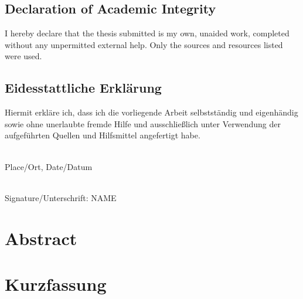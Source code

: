 \documentclass[a4paper,twoside,10pt,]{book}
\begin{document}
\frontmatter

\tpage

\cleardoublepage

\cleardoublepage
\addtocounter{page}{-2}
\section*{Declaration of Academic Integrity}

I hereby declare that the thesis submitted is my own, unaided work, completed without any unpermitted external help. Only the sources and resources listed were used.

\section*{Eidesstattliche Erklärung}

\noindent Hiermit erkläre ich, dass ich die vorliegende Arbeit selbstständig und eigenhändig sowie ohne unerlaubte fremde Hilfe und ausschließlich unter Verwendung der aufgeführten Quellen und Hilfsmittel angefertigt habe.

\vspace{2cm}

\begin{minipage}{0.5\textwidth}
\noindent\makebox[1pt][l]{\rule{.8\textwidth}{1pt}}\\[3pt]
Place/Ort, Date/Datum
\end{minipage}
\begin{minipage}{0.5\textwidth}
\noindent\makebox[1pt][l]{\rule{.8\textwidth}{1pt}}\\[3pt]
Signature/Unterschrift: NAME
\end{minipage}

\cleardoublepage

\chapter*{Abstract}

\cleardoublepage

\chapter*{Kurzfassung}
\end{document}
